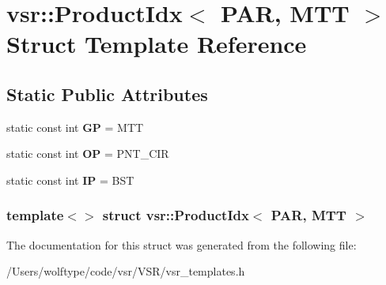 \hypertarget{structvsr_1_1_product_idx_3_01_p_a_r_00_01_m_t_t_01_4}{\section{vsr\-:\-:Product\-Idx$<$ P\-A\-R, M\-T\-T $>$ Struct Template Reference}
\label{structvsr_1_1_product_idx_3_01_p_a_r_00_01_m_t_t_01_4}
}
\subsection*{Static Public Attributes}
\begin{DoxyCompactItemize}
\item 
\hypertarget{structvsr_1_1_product_idx_3_01_p_a_r_00_01_m_t_t_01_4_a78bdf14bc17b74805111a485be61fea3}{static const int {\bfseries G\-P} = M\-T\-T}\label{structvsr_1_1_product_idx_3_01_p_a_r_00_01_m_t_t_01_4_a78bdf14bc17b74805111a485be61fea3}

\item 
\hypertarget{structvsr_1_1_product_idx_3_01_p_a_r_00_01_m_t_t_01_4_afc78ac243c434ea6cfc987c3322a63d8}{static const int {\bfseries O\-P} = P\-N\-T\-\_\-\-C\-I\-R}\label{structvsr_1_1_product_idx_3_01_p_a_r_00_01_m_t_t_01_4_afc78ac243c434ea6cfc987c3322a63d8}

\item 
\hypertarget{structvsr_1_1_product_idx_3_01_p_a_r_00_01_m_t_t_01_4_a0074a5cce45986acf4167b8675c25ede}{static const int {\bfseries I\-P} = B\-S\-T}\label{structvsr_1_1_product_idx_3_01_p_a_r_00_01_m_t_t_01_4_a0074a5cce45986acf4167b8675c25ede}

\end{DoxyCompactItemize}
\subsubsection*{template$<$$>$ struct vsr\-::\-Product\-Idx$<$ P\-A\-R, M\-T\-T $>$}



The documentation for this struct was generated from the following file\-:\begin{DoxyCompactItemize}
\item 
/\-Users/wolftype/code/vsr/\-V\-S\-R/vsr\-\_\-templates.\-h\end{DoxyCompactItemize}
